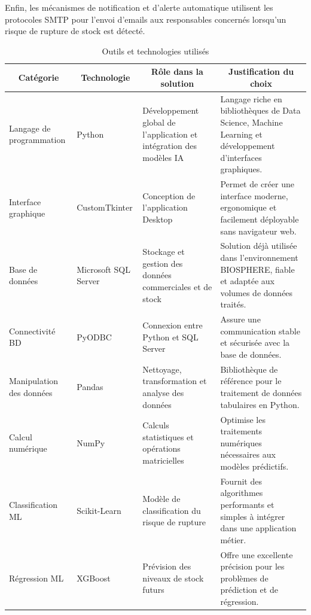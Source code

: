 Enfin, les mécanismes de notification et d'alerte automatique utilisent les protocoles SMTP pour l'envoi d'emails aux responsables concernés lorsqu'un risque de rupture de stock est détecté.

\begin{small}
\begin{longtable}{|p{2.5cm}|p{2.5cm}|p{4cm}|p{5.5cm}|}
\caption{Outils et technologies utilisés} \label{tab:ch5:outils_technologies} \\
\hline
\multicolumn{1}{|c|}{\textbf{Catégorie}} & 
\multicolumn{1}{c|}{\textbf{Technologie}} & 
\multicolumn{1}{c|}{\textbf{Rôle dans la solution}} & 
\multicolumn{1}{c|}{\textbf{Justification du choix}} \\
\hline
\endhead

\hline
\endfoot

Langage de programmation & Python & Développement global de l'application et intégration des modèles IA & Langage riche en bibliothèques de Data Science, Machine Learning et développement d'interfaces graphiques. \\
\hline
Interface graphique & CustomTkinter & Conception de l'application Desktop & Permet de créer une interface moderne, ergonomique et facilement déployable sans navigateur web. \\
\hline
Base de données & Microsoft SQL Server & Stockage et gestion des données commerciales et de stock & Solution déjà utilisée dans l'environnement BIOSPHERE, fiable et adaptée aux volumes de données traités. \\
\hline
Connectivité BD & PyODBC & Connexion entre Python et SQL Server & Assure une communication stable et sécurisée avec la base de données. \\
\hline
Manipulation des données & Pandas & Nettoyage, transformation et analyse des données & Bibliothèque de référence pour le traitement de données tabulaires en Python. \\
\hline
Calcul numérique & NumPy & Calculs statistiques et opérations matricielles & Optimise les traitements numériques nécessaires aux modèles prédictifs. \\
\hline
Classification ML & Scikit-Learn & Modèle de classification du risque de rupture & Fournit des algorithmes performants et simples à intégrer dans une application métier. \\
\hline
Régression ML & XGBoost & Prévision des niveaux de stock futurs & Offre une excellente précision pour les problèmes de prédiction et de régression. \\

\end{longtable}
\end{small}
